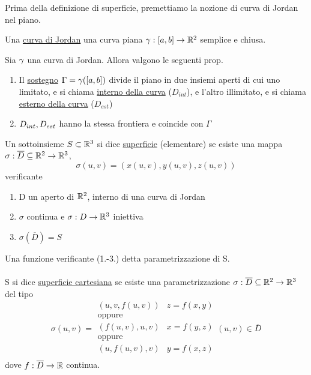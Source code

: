 Prima della definizione di superficie, premettiamo la nozione di curva di Jordan nel piano.
\begin{definition}
  Una \underline{curva di Jordan} \ace una curva piana $\gamma : [a,b]\to\mathbb{R}^2$ semplice e chiusa.
\end{definition}
\begin{theorem}[BDPG,p. 359]
  Sia $\gamma$ una curva di Jordan. Allora valgono le seguenti prop.
  \begin{enumerate}
    \item Il \underline{sostegno} $\Gamma = \gamma([a,b])$ divide il piano in due insiemi aperti
          di cui uno \ace limitato, e si chiama \underline{interno della curva} ($D_{int}$), e l'altro
          \ace illimitato, e si chiama \underline{esterno della curva} ($D_{est}$)
    \item $D_{int},D_{est}$ hanno la stessa frontiera e coincide con $\Gamma$
  \end{enumerate}
\end{theorem}
\begin{definition}
  Un sottoinsieme $S\subset\mathbb{R}^3$ si dice \underline{superficie} (elementare) se esiste una mappa
  $\sigma:\overline{D}\subseteq\mathbb{R}^2\to\mathbb{R}^3$, 
  $$\sigma(u,v) = (x(u,v),y(u,v),z(u,v))$$
  verificante
  \begin{enumerate}
    \item D \ace un aperto di $\mathbb{R}^2$, interno di una curva di Jordan
    \item $\sigma$ \ace continua e $\sigma:D\to\mathbb{R}^3$ \ace iniettiva
    \item $\sigma(\overline{D})=S$
  \end{enumerate}
  Una funzione verificante (1.-3.) \ace detta parametrizzazione di S. \\\\
  S si dice \underline{superficie cartesiana} se esiste una parametrizzazione
  $\sigma : \overline{D}\subseteq\mathbb{R}^2\to\mathbb{R}^3$ del tipo
  $$\sigma(u,v) = \begin{array}{lr}
    (u,v,f(u,v)) & z = f(x,y) \\
    \text{oppure} \\
    (f(u,v),u,v) & x = f(y,z) \\
    \text{oppure} \\
    (u,f(u,v),v) & y = f(x,z) \\
  \end{array} (u,v)\in\overline{D}$$
  dove $f:\overline{D}\to\mathbb{R}$ continua.
\end{definition}
